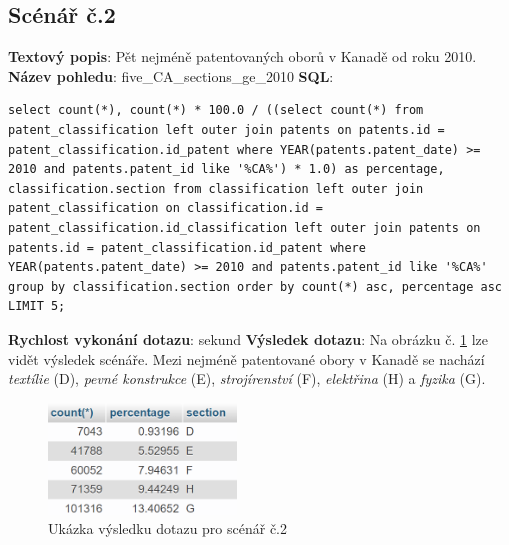 \subsection{Scénář č.2}
\textbf{Textový popis}: Pět nejméně patentovaných oborů v Kanadě od roku 2010.
\newline
\textbf{Název pohledu}: five\_CA\_sections\_ge\_2010
\newline
\textbf{SQL}: 
\begin{lstlisting}[label = {lst:elements_a}]
select count(*), count(*) * 100.0 / ((select count(*) from patent_classification left outer join patents on patents.id = patent_classification.id_patent where YEAR(patents.patent_date) >= 2010 and patents.patent_id like '%CA%') * 1.0) as percentage, classification.section from classification left outer join patent_classification on classification.id = patent_classification.id_classification left outer join patents on patents.id = patent_classification.id_patent where YEAR(patents.patent_date) >= 2010 and patents.patent_id like '%CA%' group by classification.section order by count(*) asc, percentage asc LIMIT 5;
\end{lstlisting}
\textbf{Rychlost vykonání dotazu}:  sekund
\newline
\textbf{Výsledek dotazu}: Na obrázku č. \ref{fig:scenar2} lze vidět výsledek scénáře. Mezi nejméně patentované obory v Kanadě se nachází \textit{textílie} (D), \textit{pevné konstrukce} (E), \textit{strojírenství} (F), \textit{elektřina} (H) a \textit{fyzika} (G).
\begin{figure}[H]
\centering
\includegraphics[width=5cm]{img/scenare/scenar_2}
\caption{Ukázka výsledku dotazu pro scénář č.2}
\label{fig:scenar2}
\end{figure}

\newpage
